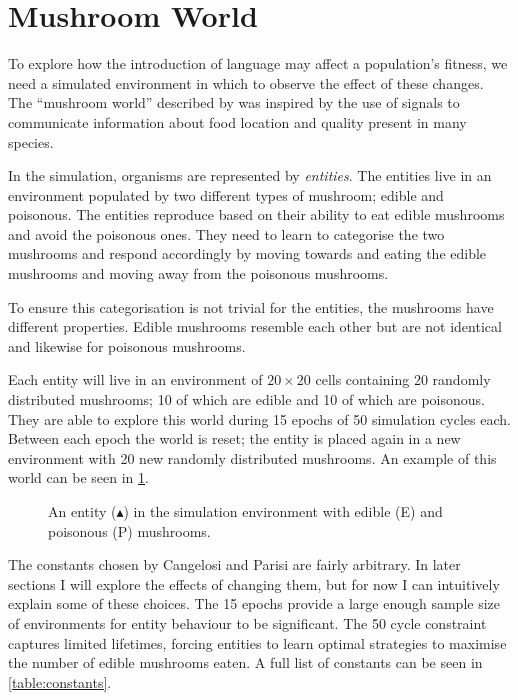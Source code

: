 \documentclass[12pt,a4paper]{report}
\begin{document}
\section{Mushroom World}\label{section:world}

To explore how the introduction of language may affect a population's fitness, we need a simulated environment in which to observe the effect of these changes. The ``mushroom world'' described by \cite{Cangelosi1998} was inspired by the use of signals to communicate information about food location and quality present in many species.

In the simulation, organisms are represented by \emph{entities}. The entities live in an environment populated by two different types of mushroom; edible and poisonous. The entities reproduce based on their ability to eat edible mushrooms and avoid the poisonous ones. They need to learn to categorise the two mushrooms and respond accordingly by moving towards and eating the edible mushrooms and moving away from the poisonous mushrooms.

To ensure this categorisation is not trivial for the entities, the mushrooms have different properties. Edible mushrooms resemble each other but are not identical and likewise for poisonous mushrooms.

Each entity will live in an environment of $20 \times 20$ cells containing 20 randomly distributed mushrooms; 10 of which are edible and 10 of which are poisonous. They are able to explore this world during 15 epochs of 50 simulation cycles each. Between each epoch the world is reset; the entity is placed again in a new environment with 20 new randomly distributed mushrooms. An example of this world can be seen in \cref{fig:environment}.

\begin{figure}[ht]
\centering
{}
\caption{An entity ($\blacktriangle$) in the simulation environment with edible (E) and poisonous (P) mushrooms.}
\label{fig:environment}
\end{figure}
The constants chosen by Cangelosi and Parisi are fairly arbitrary. In later sections I will explore the effects of changing them, but for now I can intuitively explain some of these choices. The 15 epochs provide a large enough sample size of environments for entity behaviour to be significant. The 50 cycle constraint captures limited lifetimes, forcing entities to learn optimal strategies to maximise the number of edible mushrooms eaten. A full list of constants can be seen in \cref{table:constants}.
\end{document}
